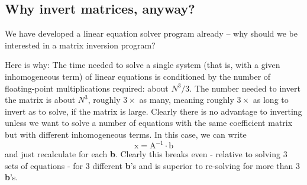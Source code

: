 \subsection{Why invert matrices, anyway?}

We have developed a linear equation solver program already
-- why should we be interested in a matrix inversion program?

Here is why: The time needed to solve a single system (that is, with a given inhomogeneous term) of linear equations is conditioned by the number of floating-point multiplications required: about $N^3/3$. The number needed to invert the matrix is about $N^3$, roughly $3\times$ as many, meaning roughly $3\times$ as long to invert as to solve, if the matrix is large. Clearly there is no advantage to inverting unless we want to solve a number of equations with the same coefficient matrix but with different inhomogeneous terms. In this case, we can write
\begin{equation}
    \label{eq:09_39}
    \mathrm{x = A^{-1} \cdot b}
\end{equation} 
and just recalculate for each \textbf{b}. Clearly this breaks even - relative to solving 3 sets of equations - for 3 different \textbf{b}'s and is superior to re-solving for more than 3 \textbf{b}'s.

